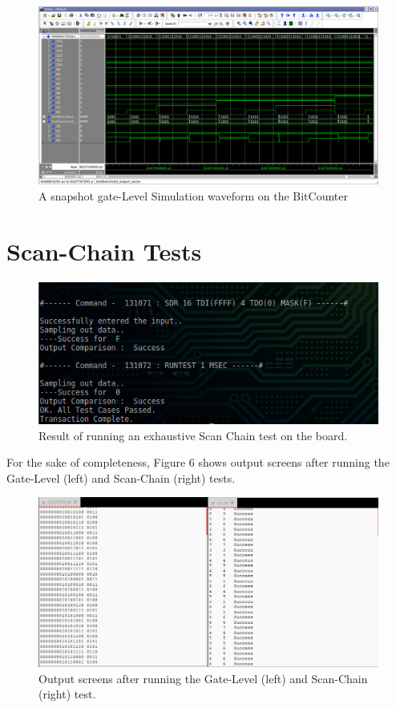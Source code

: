 \documentclass[a4paper, 11pt]{article}
\begin{document}
\begin{figure}[H]
\centering
\includegraphics[scale=0.33]{Gate}
\caption{A snapshot gate-Level Simulation waveform on the BitCounter}
\end{figure}


\section{Scan-Chain Tests}
\begin{figure}[H]
\centering
\includegraphics[scale=0.7]{Scan_Chain}
\caption{Result of running an exhaustive Scan Chain test on the board.}
\end{figure}

For the sake of completeness, Figure 6 shows output screens after running the Gate-Level (left) and Scan-Chain (right) tests.

\begin{figure}[H]
\centering
\includegraphics[scale=0.45]{Outputs}
\caption{Output screens after running the Gate-Level (left) and Scan-Chain (right) test.}
\end{figure}
\end{document}
